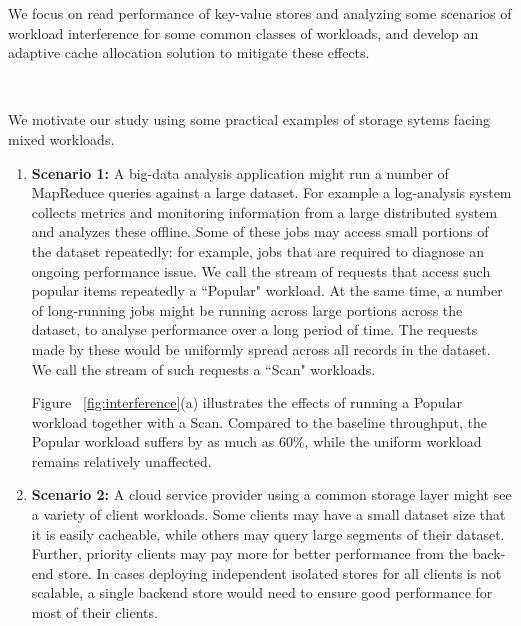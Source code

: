 \documentclass[twocolumn]{article}
\begin{document}
We focus on read performance of key-value stores and analyzing some scenarios of workload interference for some common classes of workloads, and develop an adaptive cache allocation solution to mitigate these effects.  

\begin{figure*}[ht!]\footnotesize
  \centering
  \mbox {
  \qquad
  }
  \caption{Interference between workloads}
  \label{fig:interference}
\end{figure*}

We motivate our study using some practical examples of storage sytems facing mixed workloads. 
\begin{enumerate}
\item \textbf{Scenario 1:} A big-data analysis application might run a number of MapReduce queries against a large dataset. For example a log-analysis system collects metrics and monitoring information from a large distributed system and analyzes these offline. Some of these jobs may access small portions of the dataset repeatedly: for example, jobs that are required to diagnose an ongoing performance issue. We call the stream of requests that access such popular items repeatedly a ``Popular" workload.  At the same time, a number of long-running jobs might be running across large portions across the dataset, to analyse performance over a long period of time. The requests made by these would be uniformly spread across all records in the dataset. We call the stream of such requests a ``Scan" workloads. 

Figure ~\ref{fig:interference}(a) illustrates the effects of running a Popular workload together with a Scan. Compared to the baseline throughput, the Popular workload suffers by as much as 60\%, while the uniform workload remains relatively unaffected.

\item \textbf{Scenario 2:} A cloud service provider using a common storage layer might see a variety of client workloads. Some clients may have a small dataset size that it is easily cacheable, while others may query large segments of their dataset. Further, priority clients may pay more for better performance from the back-end store. In cases deploying independent isolated stores for all clients is not scalable, a single backend store would need to ensure good performance for most of their clients. 


\end{enumerate}
\end{document}
